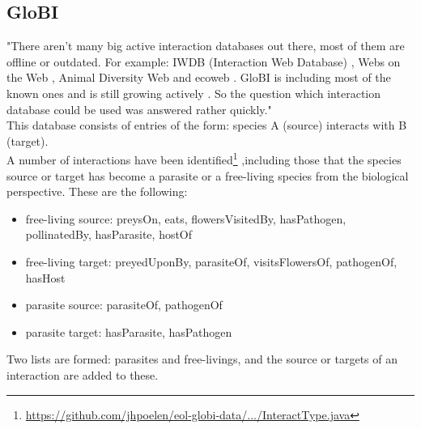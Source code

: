     \subsection{GloBI}
       "There aren't many big active interaction databases out there, most of them are 
        offline or outdated. For example: IWDB (Interaction Web Database) \cite{IWDB2003}, Webs on the 
        Web \cite{WOW2004}, Animal Diversity Web \cite{Myers2003} and ecoweb \cite{Cohen2010}. GloBI is 
        including most of the known ones and is still growing actively \cite{Poelen2014}. So the 
        question which interaction database could be used was answered rather quickly." \\

      This database consists of entries of the form: species A (source) interacts with B (target). \\
      A number of interactions have been identified\footnote{\hyperlink{
        https://github.com/jhpoelen/eol-globi-data/blob/master/eol-globi-lib/src/main/java/org/eol/globi/domain/InteractType.java
        }{https://github.com/jhpoelen/eol-globi-data/.../InteractType.java}}
        ,including those that the species source or target has become a parasite or a free-living 
        species from the biological perspective. These are the following:
      \begin{itemize}
        \item free-living source: preysOn, eats, flowersVisitedBy, hasPathogen, pollinatedBy, 
          hasParasite, hostOf
        \item free-living target: preyedUponBy, parasiteOf, visitsFlowersOf, pathogenOf, hasHost
        \item parasite source: parasiteOf, pathogenOf
        \item parasite target: hasParasite, hasPathogen
      \end{itemize}
      Two lists are formed: parasites and free-livings, and the source or targets of an interaction
        are added to these.

